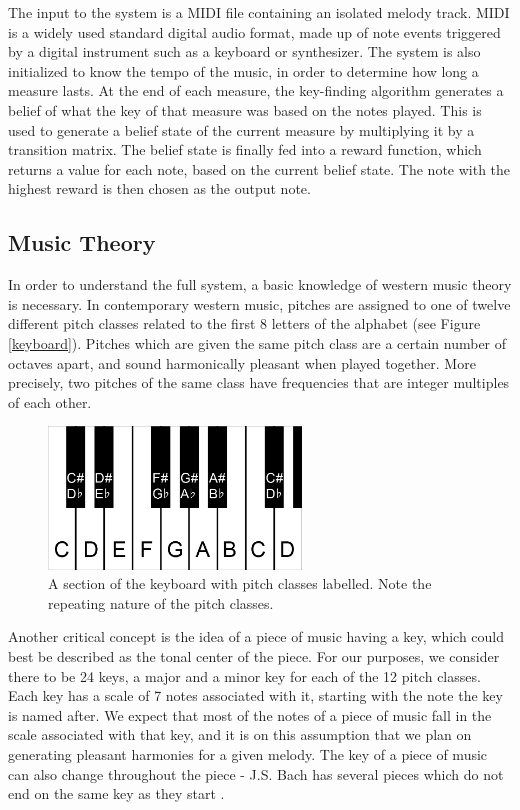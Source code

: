 \documentclass[11pt]{article} %
\begin{document}
The input to the system is a MIDI file containing an isolated melody track. MIDI is a widely used standard digital audio format, made up of note events triggered by a digital instrument such as a keyboard or synthesizer. The system is also initialized to know the tempo of the music, in order to determine how long a measure lasts. At the end of each measure, the key-finding algorithm generates a belief of what the key of that measure was based on the notes played. This is used to generate a belief state of the current measure by multiplying it by a transition matrix. The belief state is finally fed into a reward function, which returns a value for each note, based on the current belief state. The note with the highest reward is then chosen as the output note.

\subsection{Music Theory}
In order to understand the full system, a basic knowledge of western music theory is necessary. In contemporary western music, pitches are assigned to one of twelve different pitch classes related to the first 8 letters of the alphabet (see Figure \ref{keyboard}). Pitches which are given the same pitch class are a certain number of octaves apart, and sound harmonically pleasant when played together. More precisely, two pitches of the same class have frequencies that are integer multiples of each other.

\begin{figure}[h]
\centering
\includegraphics[width=0.6\textwidth]{keyboard.png}
\caption{A section of the keyboard with pitch classes labelled. Note the repeating nature of the pitch classes.}
\label{fig:keyboard}
\end{figure}

Another critical concept is the idea of a piece of music having a key, which could best be described as the tonal center of the piece. For our purposes, we consider there to be 24 keys, a major and a minor key for each of the 12 pitch classes. Each key has a scale of 7 notes associated with it, starting with the note the key is named after. We expect that most of the notes of a piece of music fall in the scale associated with that key, and it is on this assumption that we plan on generating pleasant harmonies for a given melody. The key of a piece of music can also change throughout the piece - J.S. Bach has several pieces which do not end on the same key as they start \cite{ged1979}.
\end{document}
